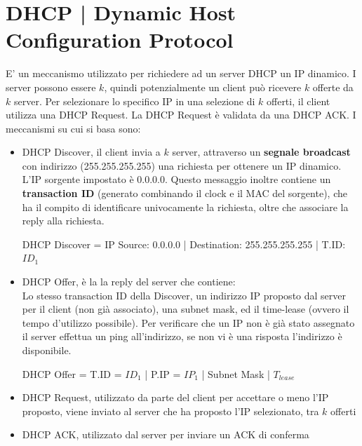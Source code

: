 \documentclass[11pt, oneside]{article}   	%
\begin{document}
\section*{DHCP | Dynamic Host Configuration Protocol}
E' un meccanismo utilizzato per richiedere ad un server DHCP un IP dinamico. I server possono essere $k$, quindi potenzialmente un client può ricevere $k$ offerte da $k$ server. Per selezionare lo specifico IP in una selezione di $k$ offerti, il client utilizza una DHCP Request. La DHCP Request è validata da una DHCP ACK.
I meccanismi su cui si basa sono:
\begin{itemize}
\item DHCP Discover, il client invia a $k$ server, attraverso un \textbf{segnale broadcast} con indirizzo (255.255.255.255) una richiesta per ottenere un IP dinamico. L'IP sorgente impostato è 0.0.0.0. Questo messaggio inoltre contiene un \textbf{transaction ID} (generato combinando il clock e il MAC del sorgente), che ha il compito di identificare univocamente la richiesta, oltre che associare la reply alla richiesta.
\begin{center}
DHCP Discover = IP Source: 0.0.0.0 | Destination: 255.255.255.255 | T.ID: $ID_1$ 
\end{center}
\item DHCP Offer, è la la reply del server che contiene:\\
Lo stesso transaction ID della Discover, un indirizzo IP proposto dal server per il client (non già associato), una subnet mask, ed il time-lease (ovvero il tempo d'utilizzo possibile).
Per verificare che un IP non è già stato assegnato il server effettua un ping all'indirizzo, se non vi è una risposta l'indirizzo è disponibile.
\begin{center}
DHCP Offer = T.ID = $ID_1$ | P.IP = $IP_1$ | Subnet Mask | $T_{lease}$
\end{center}
\item DHCP Request, utilizzato da parte del client per accettare o meno l'IP proposto, viene inviato al server che ha proposto l'IP selezionato, tra $k$ offerti
\item DHCP ACK, utilizzato dal server per inviare un ACK di conferma
\end{itemize}
\end{document}
